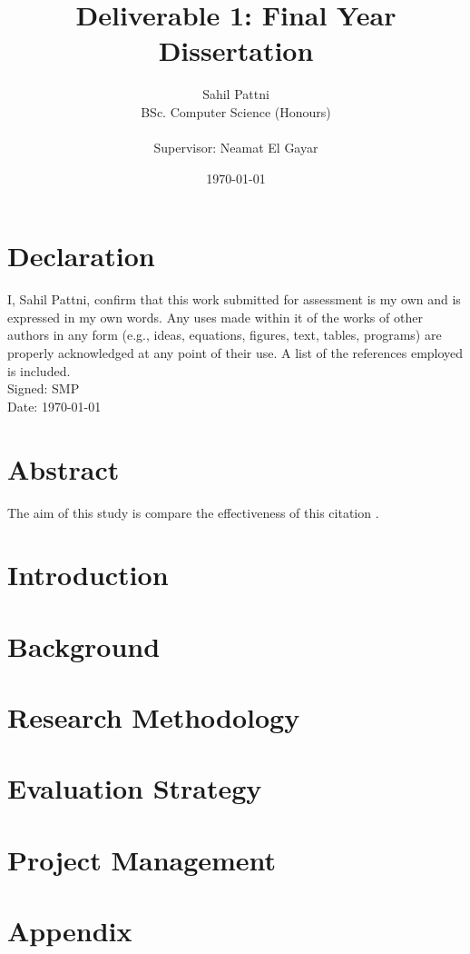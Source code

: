 \documentclass[a4paper,11pt]{article}
\begin{document}
\title{Deliverable 1: Final Year Dissertation}
\author{
	Sahil Pattni\\ 
	BSc. Computer Science (Honours)\\\\
	Supervisor: Neamat El Gayar
	}
\date{\today}
\maketitle
{}
\newpage
\section*{Declaration}
I, Sahil Pattni, confirm that this work submitted for assessment is my own and is expressed in my own words. Any uses made within it of the works of other authors in any form (e.g., ideas, equations, figures, text, tables, programs) are properly acknowledged at any point of their use. A list of the references employed is included.
\\
Signed: SMP\\
Date: \today


\section*{Abstract}
The aim of this study is compare the effectiveness of this citation \cite{apriori}.


\tableofcontents
\newpage

\section{Introduction}

\section{Background}

\section{Research Methodology}

\section{Evaluation Strategy}

\section{Project Management}


\newpage
\printbibliography

\newpage
\section*{Appendix}
\end{document}
